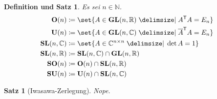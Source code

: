 \documentclass[a4paper]{article}
\theoremstyle{marginbreak}
\newtheorem{satz}[definition]{Satz}
\newtheorem{defsatz}[definition]{Definition und Satz}
\newcommand\conj{\overline}
\newcommand\transpose[1]{#1^{\mathsf{T}}}
\begin{document}
	\begin{defsatz}
		Es sei $n\in\mathbb{N}$.
		\begin{align*}
			\mathbf{O}(n) &\coloneqq \set{A\in\mathbf{GL}(n,\mathbb{R})\given \transpose{A}A=E_n}\\
			\mathbf{U}(n) &\coloneqq \set{A\in\mathbf{GL}(n,\mathbb{C})\given \transpose{\conj{A}}A=E_n}\\
			\mathbf{SL}(n, \mathbb{C}) &\coloneqq \set{A\in\mathbb{C}^{n\times n}\given\det A=1}\\
			\mathbf{SL}(n, \mathbb{R}) &\coloneqq \mathbf{SL}(n, \mathbb{C})\cap\mathbf{GL}(n, \mathbb{R})\\
			\mathbf{SO}(n) &\coloneqq \mathbf{O}(n)\cap\mathbf{SL}(n,\mathbb{R})\\
			\mathbf{SU}(n) &\coloneqq \mathbf{U}(n)\cap\mathbf{SL}(n,\mathbb{C})
		\end{align*}
	\end{defsatz}
	\begin{satz}[Iwasawa-Zerlegung]
		Nope.
	\end{satz}
\end{document}
